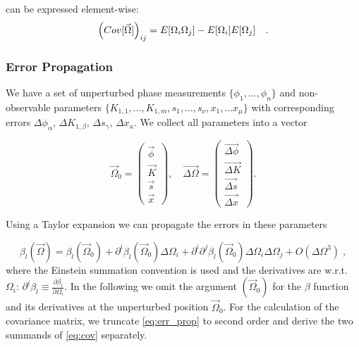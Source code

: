  can be expressed element-wise:
\begin{equation}
    \left(Cov[\vec{\Omega}]\right)_{ij} = E[\Omega_i\Omega_j] - E[\Omega_i]E[\Omega_j]
    \quad .
\end{equation}

\subsubsection{Error Propagation}

We have a set of unperturbed phase measurements $ \{\phi_1, \ldots, \phi_n\} $ and non-observable  parameters $  \{ K_{1,1} , \ldots , K_{1,m}, s_1, \ldots, s_{\nu}, x_1, \ldots x_{\mu} \} $ with corresponding errors $ \Delta \phi_\alpha,\, \Delta K_{1,\beta}, \,\Delta s_\gamma,\, \Delta x_\kappa  $. We collect all parameters into a vector

\begin{equation}
\vec{\Omega}_0 =
\begin{pmatrix}
\vec{\phi}\\
\vec{K}\\
\vec{s}\\
\vec{x}
\end{pmatrix},\quad
\vec{\Delta \Omega} = 
\begin{pmatrix}
\vec{\Delta\phi}\\
\vec{\Delta K}\\
\vec{\Delta s}\\
\vec{\Delta x}
\end{pmatrix}.
\end{equation}

Using a Taylor expansion we can propagate the errors in these parameters

\begin{equation}
\beta_l (\vec{\Omega}) = \beta_l(\vec{\Omega}_0) + \partial^i\beta_l(\vec{\Omega}_0)\Delta\Omega_i +  \partial^i\partial^j\beta_l(\vec{\Omega}_0)\Delta\Omega_i\Delta\Omega_j + O(\Delta\Omega^3)\;,
\label{eq:err_prop}
\end{equation}
where the Einstein summation convention is used and the derivatives are w.r.t. $ \Omega_i $: $ \partial^i\beta_l \equiv \frac{\partial \beta_l}{\partial \Omega_i} $. In the following we omit the argument $ (\vec{\Omega}_0) $ for the $ \beta $ function and its derivatives at the unperturbed position $ \vec{\Omega}_0 $. For the calculation of the covariance matrix, we truncate \eqref{eq:err_prop} to second order and derive the two summands of \eqref{eq:cov} separately.

